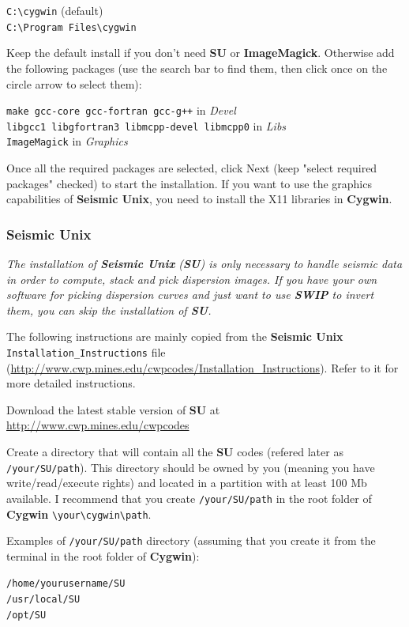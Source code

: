 \documentclass[twoside,a4paper]{article}
\def\SWIP{\textbf{SWIP}}
\def\SU{\textbf{SU}}
\def\SeismicUnix{\textbf{Seismic Unix}}
\def\ImageMagick{\textbf{ImageMagick}}
\def\Cygwin{\textbf{Cygwin}}
\begin{document}
\verb|C:\cygwin| (default)\\
\verb|C:\Program Files\cygwin|

Keep the default install if you don't need {\SU} or {\ImageMagick}. Otherwise add the following packages (use the search bar to find them, then click once on the circle arrow to select them):

\verb|make gcc-core gcc-fortran gcc-g++| in \textit{Devel}\\
\verb|libgcc1 libgfortran3 libmcpp-devel libmcpp0| in \textit{Libs}\\
\verb|ImageMagick| in \textit{Graphics}

Once all the required packages are selected, click Next (keep "select required packages" checked) to start the installation. If you want to use the graphics capabilities of {\SeismicUnix}, you need to install the X11 libraries in {\Cygwin}.

\subsubsection{Seismic Unix}
\label{subsec:WinSU}
\textit{The installation of {\SeismicUnix} ({\SU}) is only necessary to handle seismic data in order to compute, stack and pick dispersion images. If you have your own software for picking dispersion curves and just want to use {\SWIP} to invert them, you can skip the installation of {\SU}.}

The following instructions are mainly copied from the {\SeismicUnix} \verb|Installation_Instructions| file (\url{http://www.cwp.mines.edu/cwpcodes/Installation_Instructions}). Refer to it for more detailed instructions.

Download the latest stable version of {\SU} at \url{http://www.cwp.mines.edu/cwpcodes}

Create a directory that will contain all the {\SU} codes (refered later as \verb|/your/SU/path|). This directory should be owned by you (meaning you have write/read/execute rights) and located in a partition with at least 100 Mb available. I recommend that you create \verb|/your/SU/path| in the root folder of {\Cygwin} \verb|\your\cygwin\path|.

Examples of \verb|/your/SU/path| directory (assuming that you create it from the terminal in the root folder of {\Cygwin}):

\verb|/home/yourusername/SU|\\
\verb|/usr/local/SU|\\
\verb|/opt/SU|
\end{document}
